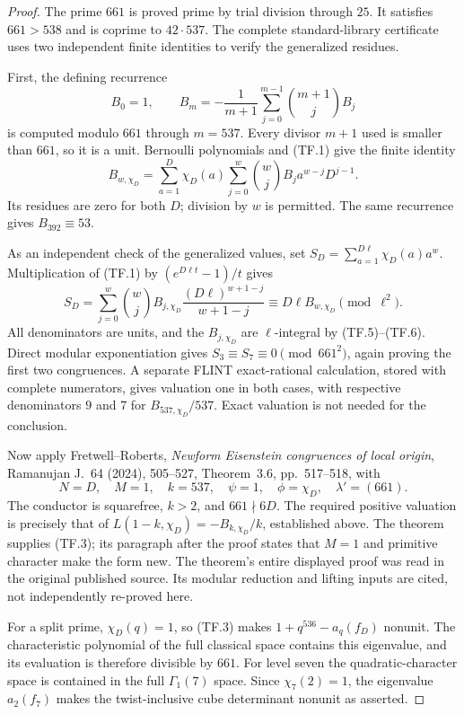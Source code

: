 \documentclass[11pt,a4paper]{article}
\theoremstyle{definition}
\begin{document}
\begin{proof}
The prime $661$ is proved prime by trial division through
$25$. It satisfies $661>538$ and is coprime to $42\cdot537$.
The complete standard-library certificate
 uses two independent
finite identities to verify the generalized residues.

First, the defining recurrence
\[
 B_0=1,\qquad
 B_m=-\frac1{m+1}\sum_{j=0}^{m-1}\binom{m+1}{j}B_j
                                                               \tag{TF.5}
\]
is computed modulo $661$ through $m=537$. Every divisor
$m+1$ used is smaller than $661$, so it is a unit.
Bernoulli polynomials and (TF.1) give the finite identity
\[
 B_{w,\chi_D}
   =\sum_{a=1}^{D}\chi_D(a)
     \sum_{j=0}^{w}\binom wj B_j a^{w-j}D^{j-1}.
                                                               \tag{TF.6}
\]
Its residues are zero for both $D$; division by $w$ is
permitted. The same recurrence gives $B_{392}\equiv53$.

As an independent check of the generalized values, set
$S_D=\sum_{a=1}^{D\ell}\chi_D(a)a^w$.
Multiplication of (TF.1) by $(e^{D\ell t}-1)/t$ gives
\[
 S_D=\sum_{j=0}^{w}\binom wj B_{j,\chi_D}
             \frac{(D\ell)^{w+1-j}}{w+1-j}
       \equiv D\ell B_{w,\chi_D}\pmod{\ell^2}.
                                                               \tag{TF.7}
\]
All denominators are units, and the $B_{j,\chi_D}$ are
$\ell$-integral by (TF.5)--(TF.6). Direct modular exponentiation
gives $S_3\equiv S_7\equiv0\pmod{661^2}$, again proving
the first two congruences. A separate FLINT exact-rational
calculation, stored with complete numerators, gives
valuation one in both cases, with respective denominators
$9$ and $7$ for $B_{537,\chi_D}/537$. Exact valuation is
not needed for the conclusion.

Now apply Fretwell--Roberts, \emph{Newform Eisenstein
congruences of local origin}, Ramanujan J.~64 (2024),
505--527, Theorem~3.6, pp.~517--518, with
\[
 N=D,\quad M=1,\quad k=537,\quad
 \psi=1,\quad\phi=\chi_D,\quad\lambda'=(661).
\]
The conductor is squarefree, $k>2$, and $661\nmid6D$.
The required positive valuation is precisely that of
$L(1-k,\chi_D)=-B_{k,\chi_D}/k$, established above.
The theorem supplies (TF.3); its paragraph after the proof
states that $M=1$ and primitive character make the form new.
The theorem's entire displayed proof was read in the original
published source. Its modular reduction and lifting inputs
are cited, not independently re-proved here.

For a split prime, $\chi_D(q)=1$, so (TF.3) makes
$1+q^{536}-a_q(f_D)$ nonunit. The characteristic polynomial
of the full classical space contains this eigenvalue,
and its evaluation is therefore divisible by $661$.
For level seven the quadratic-character space is contained
in the full $\Gamma_1(7)$ space. Since $\chi_7(2)=1$,
the eigenvalue $a_2(f_7)$ makes the twist-inclusive cube
determinant nonunit as asserted.


\end{proof}
\end{document}
